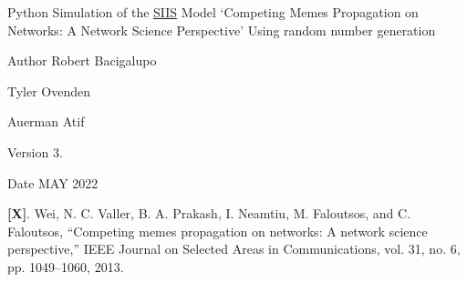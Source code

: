 Python Simulation of the \mbox{\hyperlink{namespace_s_i_i_s}{SIIS}} Model ‘\+Competing Memes Propagation on Networks\+: A Network Science Perspective’ Using random number generation \begin{DoxyAuthor}{Author}
Robert Bacigalupo 

Tyler Ovenden 

Auerman Atif 
\end{DoxyAuthor}
\begin{DoxyVersion}{Version}
3. 
\end{DoxyVersion}
\begin{DoxyDate}{Date}
MAY 2022
\end{DoxyDate}
{\bfseries [X]}. Wei, N. C. Valler, B. A. Prakash, I. Neamtiu, M. Faloutsos, and C. Faloutsos, “\+Competing memes propagation on networks\+: A network science perspective,” IEEE Journal on Selected Areas in Communications, vol. 31, no. 6, pp. 1049–1060, 2013. 